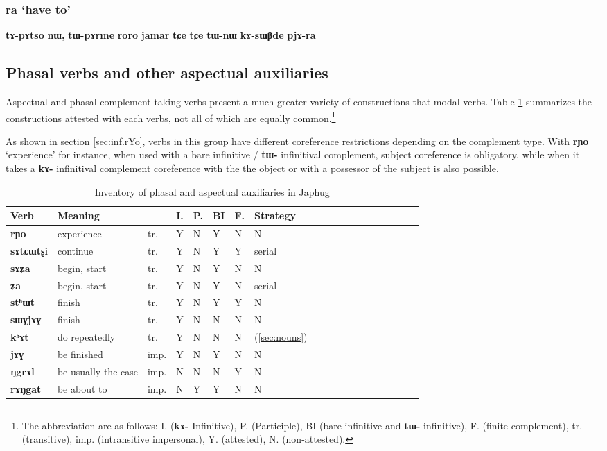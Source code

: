 \documentclass[oneside,a4paper,11pt]{article}
\newcommand{\ipa}[1]{\textbf{\phon#1}} %
\newcommand{\jpg}[2]{\ipa{#1} `#2'} %
\newcommand{\refb}[1]{(\ref{#1})}
\begin{document}
  \subsubsection{\jpg{ra}{have to}} \label{sec:ra}
  \ipa{tɤ-pɤtso} 	\ipa{nɯ,} 	\ipa{tɯ-pɤrme} 	\ipa{roro} 	\ipa{jamar} 	\ipa{tɕe} 	\ipa{tɕe} 	\ipa{tɯ-nɯ} 	\ipa{kɤ-sɯβde} 	\ipa{pjɤ-ra} 
  
  \subsection{Phasal verbs and other aspectual auxiliaries}
Aspectual and phasal complement-taking verbs present a  much greater variety of constructions that modal verbs. Table \ref{tab:phasal} summarizes the constructions attested with each verbs, not all of which are equally common.\footnote{The abbreviation are as follows: 	I. (\ipa{kɤ-} Infinitive), P.  (Participle), 	BI (bare infinitive and \ipa{tɯ-} infinitive), 	F. (finite complement), tr. (transitive), imp. (intransitive impersonal), Y. (attested), N. (non-attested).  }  

As shown in section \ref{sec:inf.rYo}, verbs in this group have different coreference restrictions depending on the complement type. With  \jpg{rɲo}{experience} for instance, when used with a bare infinitive / \ipa{tɯ-} infinitival complement, subject coreference is obligatory, while when it takes a \ipa{kɤ-} infinitival complement coreference with the the object or with a possessor of the subject is also possible.

\begin{table}[H]
\caption{Inventory of phasal and aspectual auxiliaries in Japhug} \label{tab:phasal} 
\begin{tabular}{lllllllllllllllllll}
\toprule
Verb & 	Meaning & 	 & 	I. & 	P.& 	BI & 	F. & 	Strategy & 	\\
\midrule
\ipa{rɲo} & 	experience & 	tr. & 	Y & 	N & 	Y & 	N & 	N & 	\\
\ipa{sɤtɕɯtʂi} & 	continue & 	tr. & 	Y & 	N & 	Y & 	Y & 	serial & 	\\
\ipa{sɤʑa} & 	begin, start & 	tr. & 	Y & 	N & 	Y & 	N & 	N & 	\\
\ipa{ʑa} & 	begin, start & 	tr. & 	Y & 	N & 	Y & 	N & 	serial & 	\\
\ipa{stʰɯt} & 	finish & 	tr. & 	Y & 	N & 	Y & 	Y & 	N & 	\\
\ipa{sɯɣjɤɣ} & 	finish & 	tr. & 	Y & 	N & 	N & 	N & 	N & 	\\
\ipa{kʰɤt} & 	do repeatedly & 	tr. & 	Y & 	N & 	N & 	N & 	\refb{sec:nouns}& 	\\
\midrule
\ipa{jɤɣ} & 	be finished & 	imp. & 	Y & 	N & 	Y & 	N & 	N & 	\\
\ipa{ŋgrɤl} & 	be usually the case & 	imp. & 	N & 	N & 	N & 	Y & 	N & 	\\
\ipa{rɤŋgat} & 	be about to & 	imp. & 	N & 	Y & 	Y & 	N & 	N & 	\\
\bottomrule
\end{tabular}
\end{table}
\end{document}
